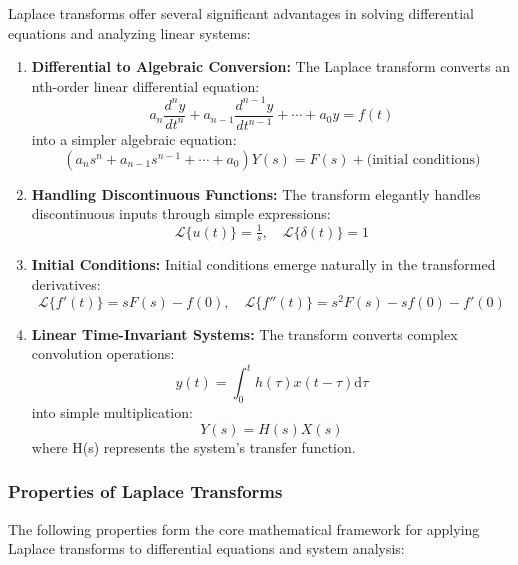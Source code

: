 \noindent Laplace transforms offer several significant advantages in solving differential equations and analyzing linear systems:
\begin{enumerate}
\item \textbf{Differential to Algebraic Conversion:}
The Laplace transform converts an nth-order linear differential equation:
\[
a_n\frac{d^n y}{dt^n} + a_{n-1}\frac{d^{n-1} y}{dt^{n-1}} + \cdots + a_0 y = f(t)
\]
into a simpler algebraic equation:
\[
(a_n s^n + a_{n-1} s^{n-1} + \cdots + a_0)Y(s) = F(s) + \text{(initial conditions)}
\]

\item \textbf{Handling Discontinuous Functions:}
The transform elegantly handles discontinuous inputs through simple expressions:
\[
\mathcal{L}\{u(t)\} = \tfrac{1}{s}, \quad \mathcal{L}\{\delta(t)\} = 1
\]

\item \textbf{Initial Conditions:}
Initial conditions emerge naturally in the transformed derivatives:
\[
\mathcal{L}\{f'(t)\} = sF(s) - f(0), \quad \mathcal{L}\{f''(t)\} = s^2F(s) - sf(0) - f'(0)
\]

\item \textbf{Linear Time-Invariant Systems:}
The transform converts complex convolution operations:
\[
y(t) = \int_{0}^{t} h(\tau)x(t - \tau)\mathrm{d}\tau
\]
into simple multiplication:
\[
Y(s) = H(s)X(s)
\]
where H(s) represents the system's transfer function.
\end{enumerate}

\subsubsection*{Properties of Laplace Transforms}

The following properties form the core mathematical framework for applying Laplace transforms to differential equations and system analysis:

